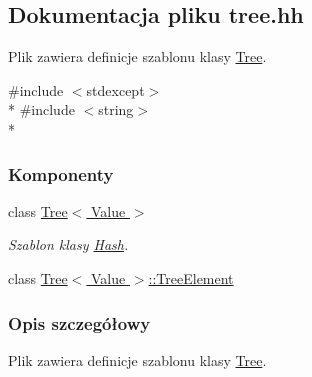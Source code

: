 \hypertarget{tree_8hh}{\subsection{Dokumentacja pliku tree.\-hh}
\label{tree_8hh}
}


Plik zawiera definicje szablonu klasy \hyperlink{class_tree}{Tree}.  


{\ttfamily \#include $<$stdexcept$>$}\\*
{\ttfamily \#include $<$string$>$}\\*
\subsubsection*{Komponenty}
\begin{DoxyCompactItemize}
\item 
class \hyperlink{class_tree}{Tree$<$ Value $>$}
\begin{DoxyCompactList}\small\item\em Szablon klasy \hyperlink{class_hash}{Hash}. \end{DoxyCompactList}\item 
class \hyperlink{class_tree_1_1_tree_element}{Tree$<$ Value $>$\-::\-Tree\-Element}
\end{DoxyCompactItemize}


\subsubsection{Opis szczegółowy}
Plik zawiera definicje szablonu klasy \hyperlink{class_tree}{Tree}. 